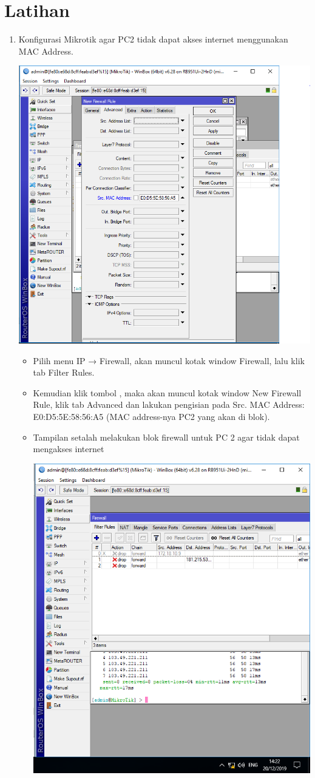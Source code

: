 \documentclass[a4paper,12pt]{article}
\begin{document}
\section{Latihan}
\begin{enumerate}
    \item Konfigurasi Mikrotik agar PC2 tidak dapat akses internet menggunakan MAC Address.
        \begin{center}
            \includegraphics[width=0.8\linewidth]{image20.png}
        \end{center}
        \begin{itemize}
            \item Pilih menu IP → Firewall, akan muncul kotak window Firewall, lalu klik tab Filter Rules.
            \item Kemudian klik tombol , maka akan muncul kotak window New Firewall Rule, klik tab Advanced dan lakukan pengisian pada Src. MAC Address: E0:D5:5E:58:56:A5 (MAC address-nya PC2 yang akan di blok).
            \item Tampilan setalah melakukan blok firewall untuk PC 2 agar tidak dapat mengakses internet
                \begin{center}
                    \includegraphics[width=0.8\linewidth]{image21.png}

\end{center}
\end{itemize}
\end{enumerate}
\end{document}
